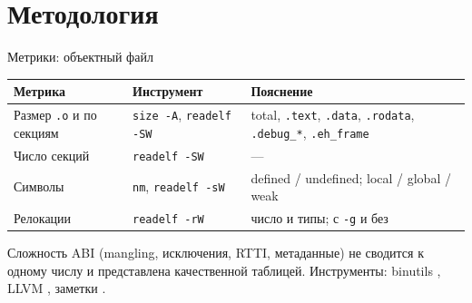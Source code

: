 \documentclass[aspectratio=169,11pt]{beamer}
\begin{document}
\section{Методология}

\begin{frame}{Метрики: объектный файл}
  \small
  \begin{center}
    \begin{tabularx}{0.98\textwidth}{lYY}
      \toprule
      Метрика                    & Инструмент                                          & Пояснение                                                                                  \\
      \midrule
      Размер \texttt{.o} и по секциям & \texttt{size -A}, \texttt{readelf -SW}         & total, \texttt{.text}, \texttt{.data}, \texttt{.rodata}, \texttt{.debug\_*}, \texttt{.eh\_frame} \\
      Число секций               & \texttt{readelf -SW}                                & ---                                                                                        \\
      Символы                    & \texttt{nm}, \texttt{readelf -sW}                   & defined / undefined; local / global / weak                                                 \\
      Релокации                  & \texttt{readelf -rW}                                & число и типы; с \texttt{-g} и без                                                          \\
      \bottomrule
    \end{tabularx}
  \end{center}
  \smallskip
  Сложность ABI (mangling, исключения, RTTI, метаданные) не сводится к одному числу и представлена качественной таблицей. Инструменты: binutils \cite{binutils}, LLVM \cite{llvmtools}, заметки \cite{maskray}.
\end{frame}
\end{document}
